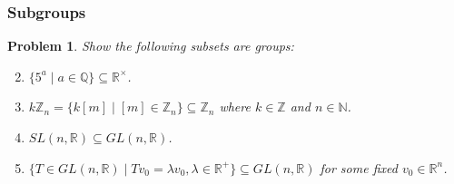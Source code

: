 \documentclass[12pt]{article}
\newtheorem{problem}{Problem}
\numberwithin{problem}{section} %
\theoremstyle{remark}  %
\begin{document}
\subsubsection{Subgroups}
\setcounter{problem}{52}
    \begin{problem}
        Show the following subsets are groups:
        \begin{enumerate}[label=(\alph*)]
            \setcounter{enumi}{1}
            \item $\{5^a\mid a \in \mathbb{Q}\} \subseteq \mathbb{R}^\times$.
            \item $k\mathbb{Z}_n=\{k[m]\mid[m]\in\mathbb{Z}_n\}\subseteq \mathbb{Z}_n$ where $k\in \mathbb{Z}$ and $n\in\mathbb{N}$.
            \setcounter{enumi}{6}
            \item $SL(n,\mathbb{R})\subseteq GL(n,\mathbb{R})$.
            \item $\{T \in GL(n,\mathbb{R}) \mid Tv_0=\lambda v_0, \lambda \in \mathbb{R}^{+}\} \subseteq GL(n,\mathbb{R})$ for some fixed $v_0\in \mathbb{R}^n$.
        \end{enumerate}
    \end{problem}
\end{document}
